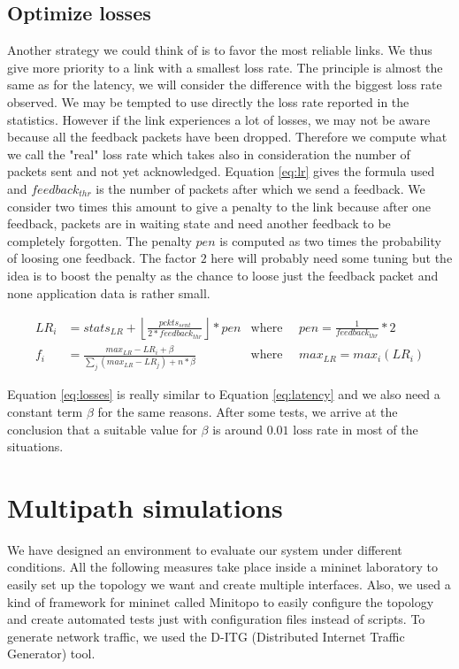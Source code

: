 \subsection{Optimize losses}

Another strategy we could think of is to favor the most reliable links. We thus give more priority to a link with a smallest loss rate. The principle is almost the same as for the latency, we will consider the difference with the biggest loss rate observed. We may be tempted to use directly the loss rate reported in the statistics. However if the link experiences a lot of losses, we may not be aware because all the feedback packets have been dropped. Therefore we compute what we call the "real" loss rate which takes also in consideration the number of packets sent and not yet acknowledged. Equation \ref{eq:lr} gives the formula used and $feedback_{thr}$ is the number of packets after which we send a feedback. We consider two times this amount to give a penalty to the link because after one feedback, packets are in waiting state and need another feedback to be completely forgotten. The penalty $pen$ is computed as two times the probability of loosing one feedback. The factor $2$ here will probably need some tuning but the idea is to boost the penalty as the chance to loose just the feedback packet and none application data is rather small. 



\begin{align}
LR_i &= stats_{LR} + \left \lfloor{\frac{pckts_{sent}}{2 * feedback_{thr}}} \right \rfloor  * pen & \text{where } \quad pen = \frac{1}{feedback_{thr}} * 2 \label{eq:lr} \\
f_i &= \frac{max_{LR} - LR_i + \beta}{\sum_j (max_{LR} - LR_j) + n*\beta } & \text{where } \quad max_{LR} = max_i(LR_i) 
\label{eq:losses}
\end{align}

Equation \ref{eq:losses} is really similar to Equation \ref{eq:latency} and we also need a constant term $\beta$ for the same reasons. After some tests, we arrive at the conclusion that a suitable value for $\beta$ is around $0.01$ loss rate in most of the situations.

\section{Multipath simulations}

We have designed an environment to evaluate our system under different conditions. All the following measures take place inside a mininet laboratory \cite{mininet} to easily set up the topology we want and create multiple interfaces. Also, we used a kind of framework for mininet called Minitopo to easily configure the topology and create automated tests just with configuration files instead of scripts. To generate network traffic, we used the D-ITG (Distributed Internet Traffic Generator)\cite{ditg} tool.

